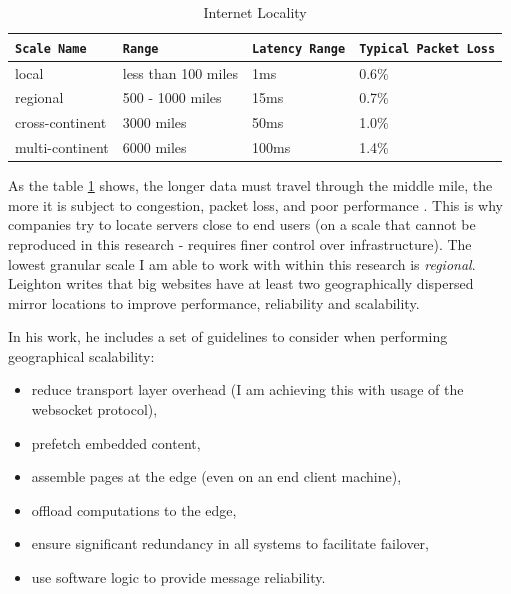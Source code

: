 \documentclass{uvamscse}
\begin{document}
\begin{table}[H]
\begin{center}
\begin{tabular}{llll}
  \texttt{Scale Name}       & \texttt{Range}        & \texttt{Latency Range}  & \texttt{Typical Packet Loss}\\
  \hline
  local                     & less than 100 miles   & 1ms                     & 0.6\% \\
  regional                  & 500 - 1000 miles      & 15ms                    & 0.7\% \\
  cross-continent           & 3000 miles            & 50ms                    & 1.0\% \\
  multi-continent           & 6000 miles            & 100ms                   & 1.4\% \\
\end{tabular}
\end{center}
\caption{Internet Locality}
\label{table:internetLocality}
\end{table}
As the table \ref{table:internetLocality} shows, the longer data must travel through the middle mile, the more it is subject to congestion, packet loss, and poor performance \cite{Akamai}. This is why companies try to locate servers close to end users (on a scale that cannot be reproduced in this research - requires finer control over infrastructure). The lowest granular scale I am able to work with within this research is \textit{regional}. Leighton writes that big websites have at least two geographically dispersed mirror locations to improve performance, reliability and scalability.

In his work, he includes a set of guidelines to consider when performing geographical scalability:
\begin{itemize}
  \item reduce transport layer overhead (I am achieving this with usage of the websocket protocol),
  \item prefetch embedded content,
  \item assemble pages at the edge (even on an end client machine),
  \item offload computations to the edge,
  \item ensure significant redundancy in all systems to facilitate failover,
  \item use software logic to provide message reliability.
\end{itemize}
\end{document}
